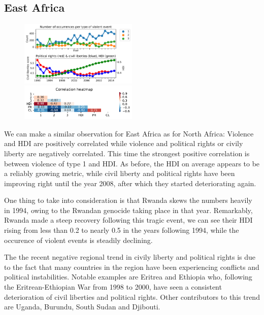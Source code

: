 \documentclass[a4paper,11pt]{article}
\begin{document}
\subsection{East Africa}
\begin{figure}[ht!]
    \includegraphics[width=0.50\textwidth]{images/ea.pdf}
    \includegraphics[width=0.50\textwidth]{images/ea_corr.pdf}
\end{figure}
We can make a similar observation for East Africa as for North Africa: Violence and HDI are positively correlated while violence and political rights or civily liberty are negatively correlated. This time the strongest positive correlation is between violence of type 1 and HDI\@. As before, the HDI on average appears to be a reliably growing metric, while civil liberty and political rights have been improving right until the year 2008, after which they started deteriorating again.

One thing to take into consideration is that Rwanda skews the numbers heavily in 1994, owing to the Rwandan genocide taking place in that year. Remarkably, Rwanda made a steep recovery following this tragic event, we can see their HDI rising from less than 0.2 to nearly 0.5 in the years following 1994, while the occurence of violent events is steadily declining.

The the recent negative regional trend in civily liberty and political rights is due to the fact that many countries in the region have been experiencing conflicts and political instabilities. Notable examples are Eritrea and Ethiopia who, following the Eritrean-Ethiopian War from 1998 to 2000, have seen a consistent deterioration of civil liberties and political rights. Other contributors to this trend are Uganda, Burundu, South Sudan and Djibouti.
\end{document}
